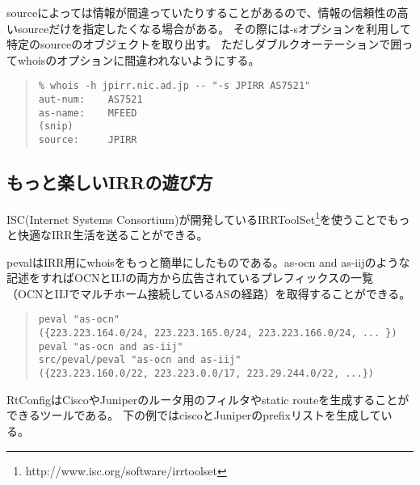 sourceによっては情報が間違っていたりすることがあるので、情報の信頼性の高いsourceだけを指定したくなる場合がある。
その際には-sオプションを利用して特定のsourceのオブジェクトを取り出す。
ただしダブルクオーテーションで囲ってwhoisのオプションに間違われないようにする。

\begin{quote}
\begin{minilinespace}
\begin{verbatim}
% whois -h jpirr.nic.ad.jp -- "-s JPIRR AS7521"
aut-num:    AS7521
as-name:    MFEED
(snip)
source:     JPIRR
\end{verbatim}
\end{minilinespace}
\end{quote}

\subsection{もっと楽しいIRRの遊び方}

ISC(Internet Systems Consortium)が開発しているIRRToolSet\footnote{http://www.isc.org/software/irrtoolset}を使うことでもっと快適なIRR生活を送ることができる。

pevalはIRR用にwhoisをもっと簡単にしたものである。as-ocn and as-iijのような記述をすればOCNとIIJの両方から広告されているプレフィックスの一覧
（OCNとIIJでマルチホーム接続しているASの経路）を取得することができる。

\begin{quote}
\begin{minilinespace}
\begin{verbatim}
peval "as-ocn"
({223.223.164.0/24, 223.223.165.0/24, 223.223.166.0/24, ... })
peval "as-ocn and as-iij"
src/peval/peval "as-ocn and as-iij"
({223.223.160.0/22, 223.223.0.0/17, 223.29.244.0/22, ...})
\end{verbatim}
\end{minilinespace}
\end{quote}

RtConfigはCiscoやJuniperのルータ用のフィルタやstatic routeを生成することができるツールである。
下の例ではciscoとJuniperのprefixリストを生成している。

\newpage

